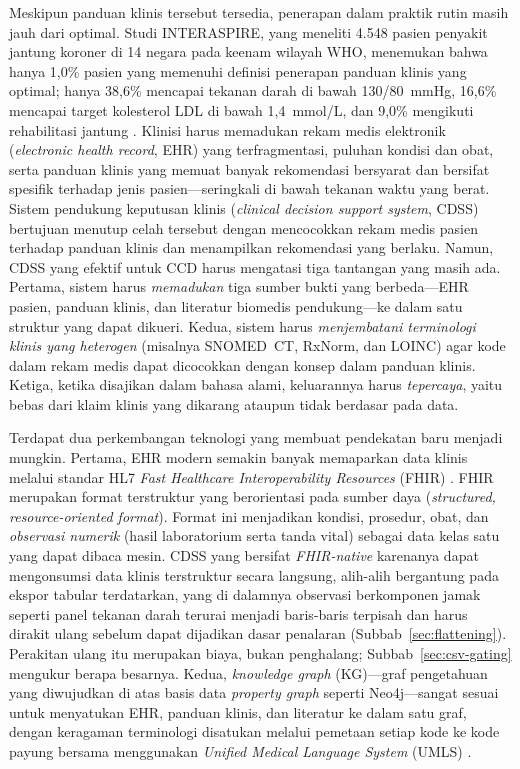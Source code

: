 Meskipun panduan klinis tersebut tersedia, penerapan dalam praktik rutin masih jauh dari optimal.
Studi INTERASPIRE, yang meneliti 4.548 pasien penyakit jantung koroner di 14 negara pada
keenam wilayah WHO, menemukan bahwa hanya 1,0\% pasien yang memenuhi definisi
penerapan panduan klinis yang optimal; hanya 38,6\% mencapai tekanan darah di bawah
130/80~mmHg, 16,6\% mencapai target kolesterol LDL di bawah 1,4~mmol/L, dan
9,0\% mengikuti rehabilitasi jantung \cite{adherence_gap}.
Klinisi harus memadukan rekam medis elektronik (\emph{electronic health record}, EHR) yang
terfragmentasi, puluhan kondisi dan obat, serta panduan klinis yang memuat banyak
rekomendasi bersyarat dan bersifat spesifik terhadap jenis pasien---seringkali di bawah tekanan waktu yang berat.
Sistem pendukung keputusan klinis (\emph{clinical decision support system}, CDSS) bertujuan
menutup celah tersebut dengan mencocokkan rekam medis pasien terhadap panduan klinis dan
menampilkan rekomendasi yang berlaku. Namun, CDSS yang efektif untuk CCD harus mengatasi
tiga tantangan yang masih ada. Pertama, sistem harus \emph{memadukan} tiga sumber bukti
yang berbeda---EHR pasien, panduan klinis, dan literatur biomedis pendukung---ke dalam satu
struktur yang dapat dikueri. Kedua, sistem harus \emph{menjembatani terminologi klinis yang
heterogen} (misalnya SNOMED~CT, RxNorm, dan LOINC) agar kode dalam rekam medis dapat
dicocokkan dengan konsep dalam panduan klinis. Ketiga, ketika disajikan dalam bahasa alami,
keluarannya harus \emph{tepercaya}, yaitu bebas dari klaim klinis yang dikarang ataupun
tidak berdasar pada data.

Terdapat dua perkembangan teknologi yang membuat pendekatan baru menjadi mungkin. Pertama, EHR modern semakin banyak memaparkan data klinis melalui standar HL7 \emph{Fast
Healthcare Interoperability Resources} (FHIR) \cite{fhir_r4}. FHIR merupakan format
terstruktur yang berorientasi pada sumber daya (\emph{structured, resource-oriented
format}). Format ini menjadikan kondisi, prosedur, obat, dan \emph{observasi numerik} (hasil
laboratorium serta tanda vital) sebagai data kelas satu yang dapat dibaca mesin. CDSS yang
bersifat \emph{FHIR-native} karenanya dapat mengonsumsi data klinis terstruktur secara
langsung, alih-alih bergantung pada ekspor tabular terdatarkan, yang di dalamnya observasi
berkomponen jamak seperti panel tekanan darah terurai menjadi baris-baris terpisah dan harus
dirakit ulang sebelum dapat dijadikan dasar penalaran (Subbab~\ref{sec:flattening}). Perakitan
ulang itu merupakan biaya, bukan penghalang; Subbab~\ref{sec:csv-gating} mengukur berapa
besarnya. Kedua, \emph{knowledge graph} (KG)---graf
pengetahuan yang diwujudkan di atas basis data \emph{property graph} seperti Neo4j---sangat
sesuai untuk menyatukan EHR, panduan klinis, dan literatur ke dalam satu graf, dengan keragaman
terminologi disatukan melalui pemetaan setiap kode ke kode payung bersama menggunakan
\emph{Unified Medical Language System} (UMLS) \cite{umls}.

